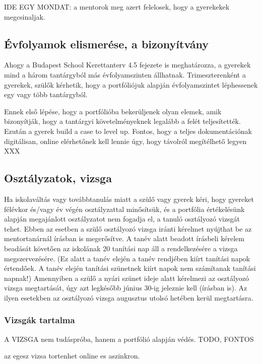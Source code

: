 IDE EGY MONDAT: a mentorok meg azert felelosek, hogy a gyerekekek
megcsinaljak.

\subsection{Évfolyamok elismerése, a
bizonyítvány}\label{uxe9vfolyamok-elismeruxe9se-a-bizonyuxedtvuxe1ny}

Ahogy a Budapest School Kerettanterv 4.5 fejezete is meghatározza, a
gyerekek mind a három tantárgyból más évfolyamszinten állhatnak.
Trimeszterenként a gyerekek, szülők kérhetik, hogy a portfóliójuk
alapján évfolyamszintet léphessenek egy vagy több tantárgyból.

Ennek első lépése, hogy a portfólióba bekerüljenek olyan elemek, amik
bizonyítják, hogy a tantárgyi követelményeknek legalább a felét
teljesítették. Ezután a gyerek build a case to level up. Fontos, hogy a
teljes dokumentációnak digitálisan, online elérhetőnek kell lennie úgy,
hogy távolról megítélhető legyen XXX

\subsection{Osztályzatok, vizsga}\label{osztuxe1lyzatok-vizsga}

Ha iskolaváltás vagy továbbtanulás miatt a szülő vagy gyerek kéri, hogy
gyereket félévkor és/vagy év végén osztályzattal minősítsük, és a
portfólia értékelésünk alapján megajánlott osztályzatot nem fogadja el,
a tanuló osztályozó vizsgát tehet. Ebben az esetben a szülő osztályozó
vizsga iránti kérelmet nyújthat be az mentortanárnál írásban is
megerősítve. A tanév alatt beadott írásbeli kérelem beadását követően az
iskolának 20 tanítási nap áll a rendelkezésére a vizsga megszervezésére.
(Ez alatt a tanév elején a tanév rendjében kiírt tanítási napok
értendőek. A tanév elején tanítási szünetnek kiírt napok nem számítanak
tanítási napnak!) Amennyiben a szülő a nyári szünet ideje alatt
kérelmezi az osztályozó vizsga megtartását, úgy azt legkésőbb június
30-ig jeleznie kell (írásban is). Az ilyen esetekben az osztályozó
vizsga augusztus utolsó hetében kerül megtartásra.

\subsubsection{Vizsgák tartalma}
A VIZSGA nem tudáspróba, hanem a portfólió alapján védés.
TODO, FONTOS

az egesz vizsa tortenhet online es aszinkron.



